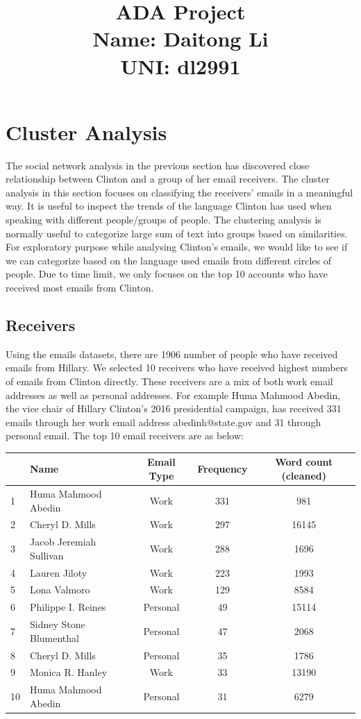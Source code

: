 \documentclass[11pt,a4paper]{article}
\title{\Large{ADA Project} 
\\ Name: Daitong Li\\ UNI: dl2991
}
\begin{document}
\maketitle
\newpage

\section*{Cluster Analysis}
The social network analysis in the previous section has discovered close relationship between Clinton and a group of her email receivers. The cluster analysis in this section focuses on classifying the receivers' emails in a meaningful way. It is useful to inspect the trends of the language Clinton has used when speaking with different people/groups of people. The clustering analysis is normally useful to categorize large sum of text into groups based on similarities. For exploratory purpose while analysing Clinton's emails, we would like to see if we can categorize based on the language used emails from different circles of people. Due to time limit, we only focuses on the top 10 accounts who have received most emails from Clinton.

\subsection*{Receivers}
Using the emails datasets, there are 1906 number of people who have received emails from Hillary. We selected 10 receivers who have received highest numbers of emails from Clinton directly.
These receivers are a mix of both work email addresses as well as personal addresses. For example Huma Mahmood Abedin, the vice chair of Hillary Clinton's 2016 presidential campaign, has received 331 emails through her work email address abedinh@state.gov and 31 through personal email. 
The top 10 email receivers are as below:
\begin{center}
  \begin{tabular}{ |l| l | c | c |c|}
    \hline
    &Name & Email Type & Frequency & Word count (cleaned)\\ \hline
    1&Huma Mahmood Abedin & Work & 331 & 981 \\ \hline
    2&Cheryl D. Mills & Work & 297 &16145 \\ \hline
    3&Jacob Jeremiah Sullivan & Work & 288 & 1696\\ \hline
    4&Lauren Jiloty & Work & 223 &1993\\ \hline
    5&Lona Valmoro & Work & 129 &8584\\ \hline
    6&Philippe I. Reines & Personal & 49 &15114\\ \hline
    7&Sidney Stone Blumenthal & Personal & 47 &2068\\ \hline
    8&Cheryl D. Mills & Personal & 35 &1786\\ \hline
    9&Monica R. Hanley & Work & 33 &13190\\ \hline
    10&Huma Mahmood Abedin & Personal & 31&6279 \\
    \hline
  \end{tabular}
\end{center}
\\
\end{document}
